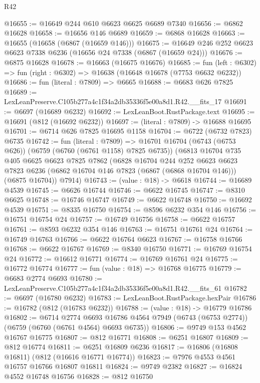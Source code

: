 \begin{lexlean}{R42}
\begin{coremodule}
{@16655 := @16649 @244 @610 @6623 @6625 @6689 @7340
@16656 := @6862 @16628
@16658 := @16656 @146 @6689
@16659 := @6868 @16628
@16663 := @16655 (@16658 (@6867 (@16659 @146)))
@16675 := @16649 @246 @252 @6623 @6623 @7338 @6236 (@16656 @24 @7338 (@6867 (@16659 @24)))
@16676 := @6875 @16628
@16678 := @16663 (@16675 @16676)
@16685 := fun (left : @6302) => fun (right : @6302) => @16638 (@16648 @16678 (@7753 @6632 @6232))
@16686 := fun (literal : @7809) => @6665
@16688 := @6683 @626 @7825
@16689 := LexLeanPreserve.C105b277a4c1f34a2db35336f5e00a8d1.R42.__fits_17
@16691 := @6697 (@16689 @6232)
@16692 := LexLeanBoot.RustPackage.text
@16695 := @16691 (@812 (@16692 @6232))
@16697 := (literal : @7809) -> @16688 @16695
@16701 := @6714 @626 @7825 @16695 @1158
@16704 := @6722 (@6732 @7823) @6735
@16742 := fun (literal : @7809) =>
  @16701
    @16704
    (@6743 (@6753 @626))
    (@6759 (@6760 (@6761 @1158) @7825 @6735))
    (@6813
      @16704
      @735
      @405
      @6625
      @6623
      @7825
      @7862
      (@6828
        @16704
        @244
        @252
        @6623
        @6623
        @7823
        @6236
        (@6862 @16704 @146 @7823 (@6867 (@6868 @16704 @146)))
        (@6875 @16704))
      @7914)
@16743 := (value : @18) -> @6618
@16744 := @16689 @4539
@16745 := @6626 @16744
@16746 := @6622 @16745
@16747 := @8310 @6625
@16748 := @16746 @16747
@16749 := @6622 @16748
@16750 := @16692 @4539
@16751 := @8335 @16750
@16754 := @8596 @6232 @354 @146
@16756 := @16751 @16754 @24
@16757 := @16749 @16756
@16758 := @6622 @16757
@16761 := @8593 @6232 @354 @146
@16763 := @16751 @16761 @24
@16764 := @16749 @16763
@16766 := @6622 @16764 @6623
@16767 := @16758 @16766
@16768 := @6622 @16767
@16769 := @8340 @16750
@16771 := @16769 @16754 @24
@16772 := @16612 @16771
@16774 := @16769 @16761 @24
@16775 := @16772 @16774
@16777 := fun (value : @18) => @16768 @16775
@16779 := @6683 @2774 @6693
@16780 := LexLeanPreserve.C105b277a4c1f34a2db35336f5e00a8d1.R42.__fits_61
@16782 := @6697 (@16780 @6232)
@16783 := LexLeanBoot.RustPackage.hexPair
@16786 := @16782 (@812 (@16783 @6232))
@16788 := (value : @18) -> @16779 @16786
@16802 := @6714
    @2774
    @6693
    @16786
    @4564
    @7949
    (@6743 (@6753 @2774))
    (@6759 (@6760 (@6761 @4564) @6693 @6735))
@16806 := @9749 @153 @4562 @16767 @16775
@16807 := @812 @16771
@16808 := @6251 @16807
@16809 := @812 @16774
@16811 := @6251 @16809 @6236
@16817 := @16806 (@16808 @16811) (@812 (@16616 @16771 @16774))
@16823 := @7976 @4553 @4561 @16757 @16766 @16807 @16811
@16824 := @9749 @2382
@16827 := @16824 @4552 @16748 @16756
@16828 := @812 @16750
}
\end{coremodule}
\end{lexlean}

